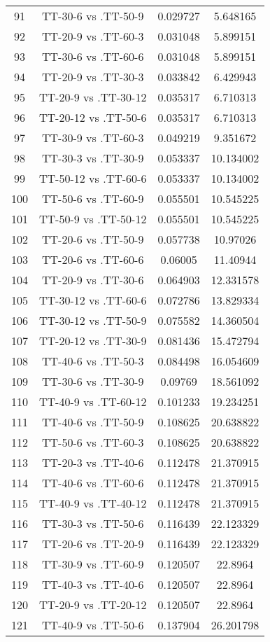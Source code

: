 \documentclass[a4paper,10pt]{article}
\begin{document}
\begin{landscape}
\begin{table}[!htp]
\begin{tabular}{cccc}
91&TT-30-6 vs .TT-50-9&0.029727&5.648165\\
92&TT-20-9 vs .TT-60-3&0.031048&5.899151\\
93&TT-30-6 vs .TT-60-6&0.031048&5.899151\\
94&TT-20-9 vs .TT-30-3&0.033842&6.429943\\
95&TT-20-9 vs .TT-30-12&0.035317&6.710313\\
96&TT-20-12 vs .TT-50-6&0.035317&6.710313\\
97&TT-30-9 vs .TT-60-3&0.049219&9.351672\\
98&TT-30-3 vs .TT-30-9&0.053337&10.134002\\
99&TT-50-12 vs .TT-60-6&0.053337&10.134002\\
100&TT-50-6 vs .TT-60-9&0.055501&10.545225\\
101&TT-50-9 vs .TT-50-12&0.055501&10.545225\\
102&TT-20-6 vs .TT-50-9&0.057738&10.97026\\
103&TT-20-6 vs .TT-60-6&0.06005&11.40944\\
104&TT-20-9 vs .TT-30-6&0.064903&12.331578\\
105&TT-30-12 vs .TT-60-6&0.072786&13.829334\\
106&TT-30-12 vs .TT-50-9&0.075582&14.360504\\
107&TT-20-12 vs .TT-30-9&0.081436&15.472794\\
108&TT-40-6 vs .TT-50-3&0.084498&16.054609\\
109&TT-30-6 vs .TT-30-9&0.09769&18.561092\\
110&TT-40-9 vs .TT-60-12&0.101233&19.234251\\
111&TT-40-6 vs .TT-50-9&0.108625&20.638822\\
112&TT-50-6 vs .TT-60-3&0.108625&20.638822\\
113&TT-20-3 vs .TT-40-6&0.112478&21.370915\\
114&TT-40-6 vs .TT-60-6&0.112478&21.370915\\
115&TT-40-9 vs .TT-40-12&0.112478&21.370915\\
116&TT-30-3 vs .TT-50-6&0.116439&22.123329\\
117&TT-20-6 vs .TT-20-9&0.116439&22.123329\\
118&TT-30-9 vs .TT-60-9&0.120507&22.8964\\
119&TT-40-3 vs .TT-40-6&0.120507&22.8964\\
120&TT-20-9 vs .TT-20-12&0.120507&22.8964\\
121&TT-40-9 vs .TT-50-6&0.137904&26.201798\\

\end{tabular}
\end{table}
\end{landscape}
\end{document}
